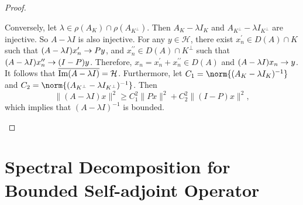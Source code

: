 \documentclass[a4paper,12pt]{article}
\begin{document}
\begin{proof}
\begin{enumerate}[label=(\arabic{*})]
        Conversely, let $\lambda \in \rho(A_K) \cap \rho(A_{K^\perp})$. Then $A_K - \lambda I_K$ and $A_{K^\perp} - \lambda I_{K^{\perp}}$ are injective. So $A -\lambda I$ is also injective. For any $y \in \mathcal{H}$, there exist $x^\prime_n \in D(A) \cap K$ such that $(A - \lambda I) x_n^\prime \rightarrow Py$, and $x_n^{\prime \prime} \in D(A) \cap K^\perp$ such that $(A - \lambda I) x_n^{\prime \prime} \rightarrow (I-P) y $. Therefore, $x_n = x_n^\prime + x_n^{\prime \prime} \in D(A)$ and $(A - \lambda I) x_n \rightarrow y$. It follows that $\overline{\operatorname{Im} (A - \lambda I)} = \mathcal{H}$. Furthermore, let $C_1 = \norm{(A_K - \lambda I_K)^{-1}}$ and $C_2 = \norm{(A_{K^\perp} - \lambda I_{K^\perp})^{-1}}$. Then
        \begin{equation*}
            \|(A-\lambda I) x\|^2 \geq C_1^2\|P x\|^2+C_2^2\|(I-P) x\|^2,
        \end{equation*}
        which implies that $(A-\lambda I)^{-1}$ is bounded. \qedhere
    \end{enumerate}
\end{proof}

\section{Spectral Decomposition for Bounded Self-adjoint Operator}
\end{document}
